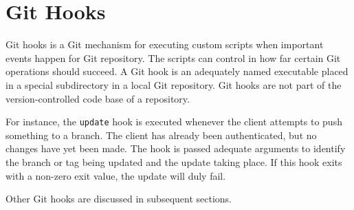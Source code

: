 
\section{Git Hooks}

Git hooks is a Git mechanism for executing custom scripts when important events
happen for Git repository\cite{man-5-githooks}. The scripts can control in how
far certain Git operations should succeed. A Git hook is an adequately named
executable placed in a special subdirectory in a local Git repository. Git
hooks are not part of the version-controlled code base of a repository.

For instance, the \texttt{update} hook is executed whenever the client attempts
to push something to a branch. The client has already been authenticated, but
no changes have yet been made. The hook is passed adequate arguments to
identify the branch or tag being updated and the update taking place. If this
hook exits with a non-zero exit value, the update will duly fail.

Other Git hooks are discussed in subsequent sections.
